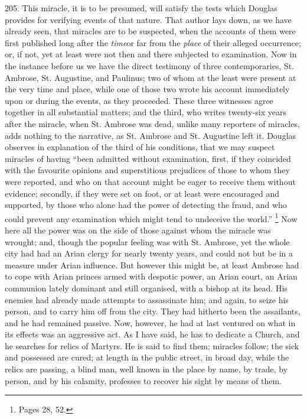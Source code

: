 205.
This miracle, it is to be presumed, will satisfy the tests which
Douglas provides for verifying events of that nature. That author lays
down, as we have already seen, that miracles are to be suspected, when
the accounts of them were first published long after the \emph{time}\emph{}or far from the \emph{place}
of their alleged occurrence; or, if not, yet at least were not
then and there subjected to examination. Now in the instance before us
we have the direct testimony of three contemporaries, St. Ambrose, St.
Augustine, and Paulinus; two of whom at the least were present at the
very time and place, while one of those two wrote his account
immediately upon or during the events, as they proceeded. These three
witnesses agree together in all substantial matters; and the third,
who writes twenty-six years after the miracle, when St. Ambrose was
dead, unlike many reporters of miracles, adds nothing to the
narrative, as St. Ambrose and St. Augustine left it. Douglas observes
in explanation of the third of his conditions, that we may suspect
miracles of having ``been admitted without examination, first, if they
coincided with the favourite opinions and superstitious prejudices of
those to whom they were reported, and who on that account might be
eager to receive them without evidence; secondly, if they were set on
foot, or at least were encouraged and supported, by those who
alone had the power of detecting the fraud, and who could prevent any
examination which might tend to undeceive the world.'' \footnote{Pages 28, 52.} Now here all the power was on the side of those against whom
the miracle was wrought; and, though the popular feeling was with St.
Ambrose, yet the whole city had had an Arian clergy for nearly twenty
years, and could not but be in a measure under Arian influence. But
however this might be, at least Ambrose had to cope with Arian princes
armed with despotic power, an Arian court, an Arian communion lately
dominant and still organised, with a bishop at its head. His enemies
had already made attempts to assassinate him; and again, to seize his
person, and to carry him off from the city. They had hitherto been the
assailants, and he had remained passive. Now, however, he had at last
ventured on what in its effects was an aggressive act. As I have said,
he has to dedicate a Church, and he searches for relics of Martyrs. He
is said to find them; miracles follow; the sick and possessed are
cured; at length in the public street, in broad day, while the relics
are passing, a blind man, well known in the place by name, by trade,
by person, and by his calamity, professes to recover his sight by
means of them.

